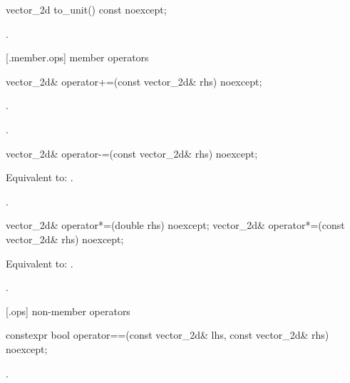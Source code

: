 \begin{itemdecl}
vector_2d to_unit() const noexcept;
\end{itemdecl}
\begin{itemdescr}
\pnum
\returns
{}.
\end{itemdescr}

 [\vectortwod.member.ops] { member operators}

\begin{itemdecl}
vector_2d& operator+=(const vector_2d& rhs) noexcept;
\end{itemdecl}
\begin{itemdescr}
\pnum
\effects
{}.
	
\pnum
\returns
{}.
\end{itemdescr}

\begin{itemdecl}
vector_2d& operator-=(const vector_2d& rhs) noexcept;
\end{itemdecl}
\begin{itemdescr}
\pnum
\effects
Equivalent to: .

\pnum
\returns
{}.
\end{itemdescr}

\begin{itemdecl}
vector_2d& operator*=(double rhs) noexcept;
vector_2d& operator*=(const vector_2d& rhs) noexcept;
\end{itemdecl}
\begin{itemdescr}
\pnum
\effects
Equivalent to: .
	
\pnum
\returns
{}.
\end{itemdescr}

 [\vectortwod.ops] { non-member operators}

\begin{itemdecl}
constexpr bool operator==(const vector_2d& lhs, const vector_2d& rhs) noexcept;
\end{itemdecl}
\begin{itemdescr}
\pnum
\returns
{}.
\end{itemdescr}

